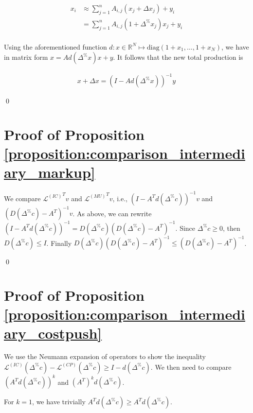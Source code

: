 \documentclass{article}
\begin{document}
\begin{align*}
    x_i & \approx \sum_{j=1}^n A_{i,j} (x_j + \Delta x_j) + y_i \\
        & = \sum_{j=1}^n A_{i,j} (1 + \Delta^{\%}x_j) x_j + y_i \\
\end{align*}

\noindent Using the aforementioned function $d:x \in \mathbb{R}^N \mapsto \text{diag} \left( {1 + x_1}, \dots, {1 + x_N} \right)$, we have in matrix form $x = A d(\Delta^\%x) x + y$. It follows that the new total production is

\begin{align*}
    x + \Delta x = \left(I - A d(\Delta^\%x) \right)^{-1} y
\end{align*}

\qed

\section{Proof of Proposition \ref{proposition:comparison_intermediary_markup}}
\label{appendix:comparison_intermediary_markup}

We compare ${\mathcal{L}^{(IC)}}^T v$ and ${\mathcal{L}^{(MU)}}^T v$, i.e., $\left( I - A^T d(\Delta^\% c) \right)^{-1}v$ and $\left( D(\Delta^\% c) - A^T \right)^{-1} v$. 
As above, we can rewrite $\left( I - A^T d(\Delta^\% c) \right)^{-1} = D(\Delta^\% c) \left( D(\Delta^\% c) - A^T \right)^{-1}$. Since $\Delta^\% c \geq 0$, then $D(\Delta^\% c) \leq I$. Finally $D(\Delta^\% c) \left( D(\Delta^\% c) - A^T \right)^{-1} \leq \left( D(\Delta^\% c) - A^T \right)^{-1}$. 

\qed

\section{Proof of Proposition \ref{proposition:comparison_intermediary_costpush}}
\label{appendix:comparison_intermediary_costpush}

We use the Neumann expansion of operators to show the inequality ${\mathcal{L}^{(IC)}(\Delta^\%c)} - {\mathcal{L}^{(CP)}(\Delta^\%c)} \geq I - d(\Delta^\% c)$. We then need to compare $\left( A^T d(\Delta^\%c) \right)^k$ and $\left( A^T \right)^k d(\Delta^\%c)$. 

\vspace{0.1cm}

\noindent For $k=1$, we have trivially $A^T d(\Delta^\%c) \geq A^T d(\Delta^\%c)$.
\end{document}
